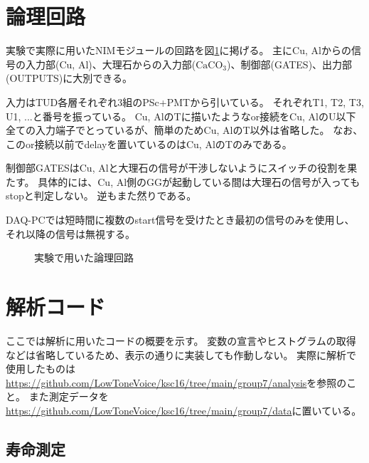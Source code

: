 \documentclass[dvipdfmx]{jsarticle}
\renewcommand{\theequation}{\thesection.\arabic{equation}}
\renewcommand{\thefigure}{\thesection.\arabic{figure}}
\renewcommand{\thetable}{\thesection.\arabic{table}}
\begin{document}
\appendix
\setcounter{section}{0}
\setcounter{equation}{1}
\setcounter{figure}{1}
\setcounter{table}{1}
\renewcommand{\theequation}{\Alph{section}.\arabic{equation} }
\renewcommand{\thefigure}{\Alph{section}.\arabic{equation} }
\renewcommand{\thetable}{\Alph{section}.\arabic{equation} }


\section{論理回路}
\label{sec: logic circuit}

実験で実際に用いたNIMモジュールの回路を図\ref{fig: full circuit}に掲げる。
主にCu, Alからの信号の入力部(Cu, Al)、大理石からの入力部($\mathrm{CaCO_3}$)、制御部(GATES)、出力部(OUTPUTS)に大別できる。

入力はTUD各層それぞれ3組のPSc+PMTから引いている。
それぞれT1, T2, T3, U1, ...と番号を振っている。
Cu, AlのTに描いたようなor接続をCu, AlのU以下全ての入力端子でとっているが、簡単のためCu, AlのT以外は省略した。
なお、このor接続以前でdelayを置いているのはCu, AlのTのみである。

制御部GATESはCu, Alと大理石の信号が干渉しないようにスイッチの役割を果たす。
具体的には、Cu, Al側のGGが起動している間は大理石の信号が入ってもstopと判定しない。
逆もまた然りである。

DAQ-PCでは短時間に複数のstart信号を受けたとき最初の信号のみを使用し、それ以降の信号は無視する。

\begin{landscape}
    \begin{figure}
        \centering
        
        \caption{実験で用いた論理回路}
        \label{fig: full circuit}
    \end{figure}
\end{landscape}


\section{解析コード}

ここでは解析に用いたコードの概要を示す。
変数の宣言やヒストグラムの取得などは省略しているため、表示の通りに実装しても作動しない。
実際に解析で使用したものは\url{https://github.com/LowToneVoice/ksc16/tree/main/group7/analysis}を参照のこと。
また測定データを\url{https://github.com/LowToneVoice/ksc16/tree/main/group7/data}に置いている。

\subsection{寿命測定}
\end{document}
